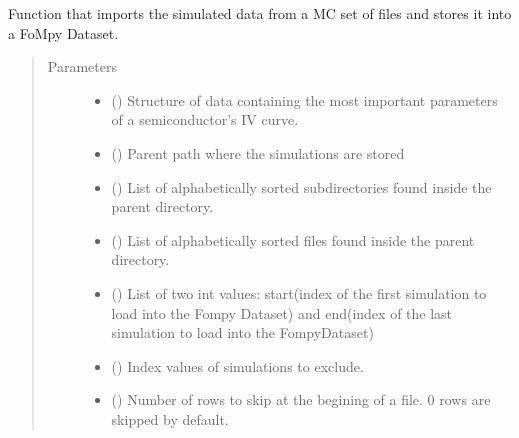 \documentclass[letterpaper,10pt,english,openany, oneside]{sphinxmanual}
\begin{document}

\begin{fulllineitems}
\label{\detokenize{index:fompy.fds.MC}}
Function that imports the simulated data from a MC set of files and
stores it into a FoMpy Dataset.
\begin{quote}\begin{description}
\item[{Parameters}] \leavevmode\begin{itemize}
\item {} 
 () \textendash{} Structure of data containing the most important parameters of a semiconductor’s IV curve.

\item {} 
 () \textendash{} Parent path where the simulations are stored

\item {} 
 () \textendash{} List of alphabetically sorted subdirectories found inside the parent directory.

\item {} 
 () \textendash{} List of alphabetically sorted files found inside the parent directory.

\item {} 
 () \textendash{} List of two int values: start(index of the first simulation to load into the Fompy Dataset)
and end(index of the last simulation to load into the FompyDataset)

\item {} 
 () \textendash{} Index values of simulations to exclude.

\item {} 
 () \textendash{} Number of rows to skip at the begining of a file. 0 rows are skipped by default.


\end{itemize}
\end{description}
\end{quote}
\end{fulllineitems}
\end{document}
